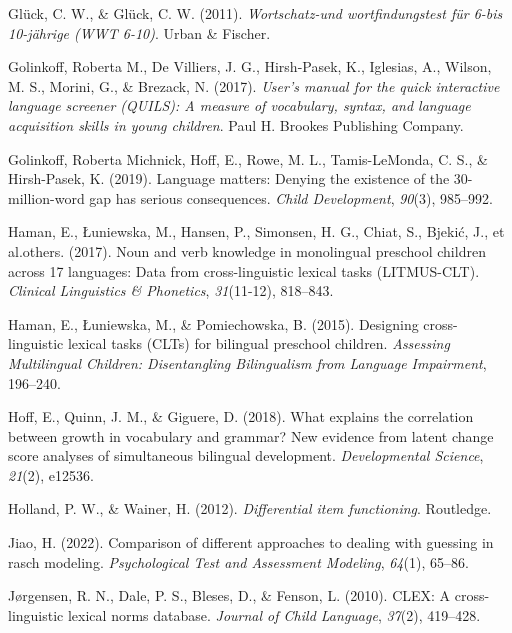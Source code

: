 \documentclass[
  man,floatsintext]{apa6}
\newlength{\cslhangindent}
\newlength{\cslentryspacingunit} %
\newenvironment{CSLReferences}[2] %
 {%
  \setlength{\parindent}{0pt}
  \ifodd #1
  \let\oldpar\par
  \def\par{\hangindent=\cslhangindent\oldpar}
  \fi
  \setlength{\parskip}{#2\cslentryspacingunit}
 }%
 {}
\begin{document}
\begin{CSLReferences}{1}{0}
\leavevmode{}%
Glück, C. W., \& Glück, C. W. (2011). \emph{Wortschatz-und wortfindungstest f{ü}r 6-bis 10-j{ä}hrige (WWT 6-10)}. Urban \& Fischer.

\leavevmode{}%
Golinkoff, Roberta M., De Villiers, J. G., Hirsh-Pasek, K., Iglesias, A., Wilson, M. S., Morini, G., \& Brezack, N. (2017). \emph{User's manual for the quick interactive language screener (QUILS): A measure of vocabulary, syntax, and language acquisition skills in young children}. Paul H. Brookes Publishing Company.

\leavevmode{}%
Golinkoff, Roberta Michnick, Hoff, E., Rowe, M. L., Tamis-LeMonda, C. S., \& Hirsh-Pasek, K. (2019). Language matters: Denying the existence of the 30-million-word gap has serious consequences. \emph{Child Development}, \emph{90}(3), 985--992.

\leavevmode{}%
Haman, E., Łuniewska, M., Hansen, P., Simonsen, H. G., Chiat, S., Bjekić, J., et al.others. (2017). Noun and verb knowledge in monolingual preschool children across 17 languages: Data from cross-linguistic lexical tasks (LITMUS-CLT). \emph{Clinical Linguistics \& Phonetics}, \emph{31}(11-12), 818--843.

\leavevmode{}%
Haman, E., Łuniewska, M., \& Pomiechowska, B. (2015). Designing cross-linguistic lexical tasks (CLTs) for bilingual preschool children. \emph{Assessing Multilingual Children: Disentangling Bilingualism from Language Impairment}, 196--240.

\leavevmode{}%
Hoff, E., Quinn, J. M., \& Giguere, D. (2018). What explains the correlation between growth in vocabulary and grammar? New evidence from latent change score analyses of simultaneous bilingual development. \emph{Developmental Science}, \emph{21}(2), e12536.

\leavevmode{}%
Holland, P. W., \& Wainer, H. (2012). \emph{Differential item functioning}. Routledge.

\leavevmode{}%
Jiao, H. (2022). Comparison of different approaches to dealing with guessing in rasch modeling. \emph{Psychological Test and Assessment Modeling}, \emph{64}(1), 65--86.

\leavevmode{}%
Jørgensen, R. N., Dale, P. S., Bleses, D., \& Fenson, L. (2010). CLEX: A cross-linguistic lexical norms database. \emph{Journal of Child Language}, \emph{37}(2), 419--428.


\end{CSLReferences}
\end{document}
